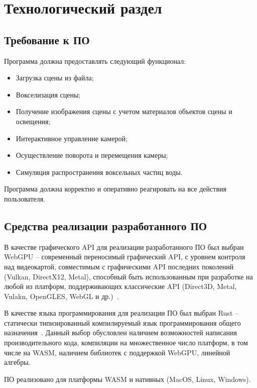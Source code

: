 \chapter{Технологический раздел}

\section{Требование к ПО}

Программа должна предоставлять следующий функционал:
\begin{itemize}[label*=---]
    \item Загрузка сцены из файла;
    \item Вокселизация сцены;
    \item Получение изображения сцены с учетом материалов объектов сцены и освещения;
    \item Интерактивное управление камерой;
    \item Осуществление поворота и перемещения камеры;
    \item Симуляция распространения воксельных частиц воды.
\end{itemize}

Программа должна корректно и оперативно реагировать на все действия пользователя.

\section{Средства реализации разработанного ПО}

В качестве графического API для реализации разработанного ПО 
был выбран WebGPU -- современный переносимый графический
API, с уровнем контроля над видеокартой, совместимым с графическими API последних поколений 
(Vulkan, DirectX12, Metal), способный быть использованным при разработке на любой из платформ, 
поддерживающих классические API (Direct3D, Metal, Vulakn, OpenGLES, WebGL и др.)~\cite{WebGPU}.

В качестве языка программирования для реализации ПО был выбран Rust -- 
статически типизированный компилируемый язык программирования общего назначения~\cite{Rust}.
Данный выбор обусловлен наличием возможностей написания производительного кода, 
компиляции на множественное число платформ, в том числе на WASM, наличием
библиотек с поддержкой WebGPU, линейной алгебры.

ПО реализовано для платформы WASM и нативных (MacOS, Linux, Windows).
